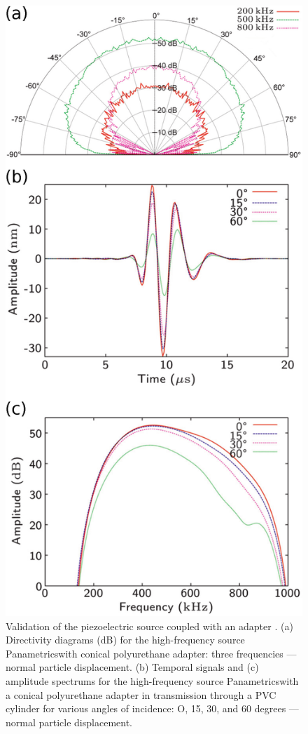 \documentclass[manuscript,revised]{geophysics}
\begin{document}
\begin{figure}[!ht]
	\centering
	\includegraphics[scale=0.4]{fig/piezo-source-validation.eps}
	\caption{Validation of the piezoelectric source coupled with an adapter \citep{Bretaudeau_SSM_2011}. (a) Directivity diagrams (dB) for the high-frequency source Panametrics\textregistered with conical polyurethane adapter: three frequencies — normal particle displacement. (b) Temporal signals and (c) amplitude spectrums for the high-frequency source Panametrics\textregistered with a conical polyurethane adapter in transmission through a PVC cylinder for	various angles of incidence: O, 15, 30, and 60 degrees — normal particle displacement.}
	\label{piezo-source-validation}
\end{figure}
\end{document}
